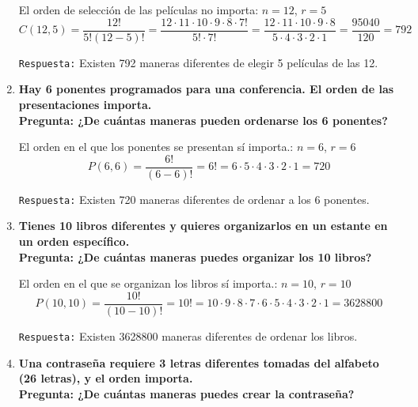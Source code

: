 \documentclass[12pt]{article}
\begin{document}
\begin{enumerate}[label=\textbf{\arabic*.}]
        El orden de selección de las películas no importa: $n = 12$, $r = 5$\\

        \[C(12, 5) = \frac{12!}{5!(12 - 5)!} = \frac{12\cdot 11\cdot 10\cdot 9\cdot 8\cdot 7!}{5!\cdot 7!} =  
        \frac{12\cdot 11\cdot 10\cdot 9\cdot 8}{5\cdot 4\cdot 3\cdot 2\cdot 1}  = \frac{95040}{120} = 792\]

        \texttt{Respuesta:} Existen 792 maneras diferentes de elegir 5 películas de las 12.
        


        \item \textbf{Hay 6 ponentes programados para una conferencia. El orden de las
        presentaciones importa.\\
        Pregunta: ¿De cuántas maneras pueden ordenarse los 6 ponentes?}

        El orden en el que los ponentes se presentan sí importa.: $n = 6$, $r = 6$\\

        \[P(6, 6) = \frac{6!}{(6 - 6)!} = 6! = 6\cdot 5\cdot 4\cdot 3\cdot 2\cdot 1 = 720\]

        \texttt{Respuesta:} Existen 720 maneras diferentes de ordenar a los 6 ponentes.
        


        \item \textbf{Tienes 10 libros diferentes y quieres organizarlos en un estante en un orden
        específico.\\
        Pregunta: ¿De cuántas maneras puedes organizar los 10 libros?}

        El orden en el que se organizan los libros sí importa.: $n = 10$, $r = 10$\\

        \[P(10, 10) = \frac{10!}{(10 - 10)!} = 10! = 10\cdot 9\cdot 8\cdot 7\cdot 6\cdot 5\cdot 4\cdot 3\cdot 2\cdot 1 = 3628800\]

        \texttt{Respuesta:} Existen 3628800 maneras diferentes de ordenar los libros.
        
        


        \item \textbf{Una contraseña requiere 3 letras diferentes tomadas del alfabeto (26 letras), y
        el orden importa.\\
        Pregunta: ¿De cuántas maneras puedes crear la contraseña?}


\end{enumerate}
\end{document}
